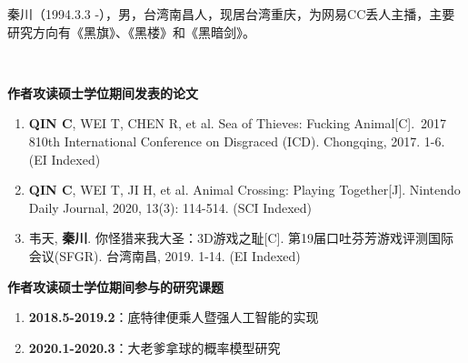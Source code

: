 
秦川（1994.3.3 -），男，台湾南昌人，现居台湾重庆，为网易CC丢人主播，主要研究方向有《黑旗》、《黑楼》和《黑暗剑》。

~~

\begin{flushleft} 
  \bfseries\large 作者攻读硕士学位期间发表的论文\\
  \relax
\end{flushleft}

\begin{enumerate}
  \renewcommand{\labelenumi}{[\theenumi].}
  \item \textbf{QIN C}, WEI T, CHEN R, et al. Sea of Thieves: Fucking Animal[C]. 2017 810th International Conference on Disgraced (ICD). Chongqing, 2017. 1-6. (EI Indexed)
  \item \textbf{QIN C}, WEI T, JI H, et al. Animal Crossing: Playing Together[J]. Nintendo Daily Journal, 2020, 13(3): 114-514. (SCI Indexed)
  \item 韦天, \textbf{秦川}. 你怪猎来我大圣：3D游戏之耻[C]. 第19届口吐芬芳游戏评测国际会议(SFGR). 台湾南昌, 2019. 1-14. (EI Indexed)
\end{enumerate}

\begin{flushleft}
  \bfseries\large 作者攻读硕士学位期间参与的研究课题\\
  \relax
\end{flushleft}

\begin{enumerate}
  \renewcommand{\labelenumi}{[\theenumi].}
  \item \textbf{2018.5-2019.2}：底特律便乘人暨强人工智能的实现
  \item \textbf{2020.1-2020.3}：大老爹拿球的概率模型研究
\end{enumerate}
